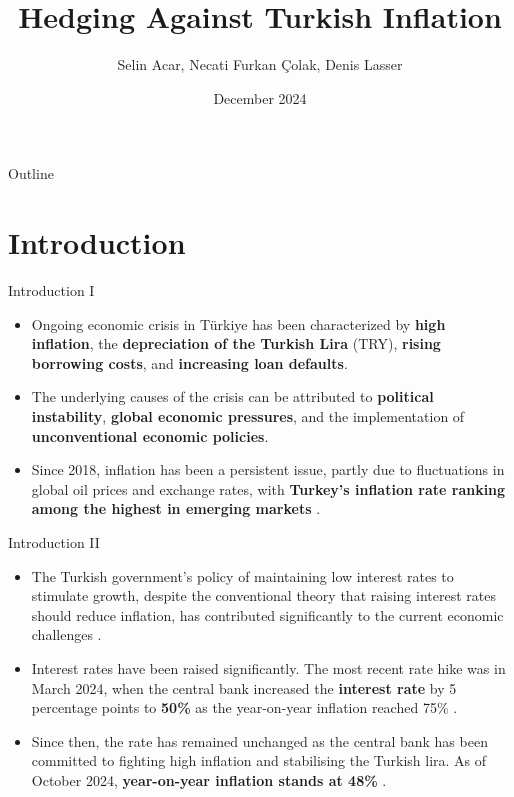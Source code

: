 \documentclass{beamer}
\title{Hedging Against Turkish Inflation}
\author{Selin Acar, Necati Furkan Çolak, Denis Lasser}
\date{December 2024}
\begin{document}
\frame{\titlepage}

\begin{frame}{Outline}
\tableofcontents
\end{frame}

\section{Introduction}
\begin{frame}{Introduction I}
\begin{itemize}
\tightlist
\item Ongoing economic crisis in Türkiye has been characterized by
\textbf{high inflation}, the \textbf{depreciation of the Turkish Lira}
(TRY), \textbf{rising borrowing costs}, and \textbf{increasing loan
defaults}.
\item The underlying causes of the crisis can be attributed to
\textbf{political instability}, \textbf{global economic pressures},
and the implementation of \textbf{unconventional economic policies}.
\item Since 2018, inflation has been a persistent issue, partly due to
fluctuations in global oil prices and exchange rates, with
\textbf{Turkey's inflation rate ranking among the highest in emerging
markets} \citep{yilmazkuday_2022}.
\end{itemize}
\end{frame}

\begin{frame}{Introduction II}
\begin{itemize}
\tightlist
\item The Turkish government's policy of maintaining low interest rates to
stimulate growth, despite the conventional theory that raising
interest rates should reduce inflation, has contributed significantly
to the current economic challenges \citep{kantur_ozcan_2021}.
\item Interest rates have been raised significantly. The most recent rate
hike was in March 2024, when the central bank increased the
\textbf{interest rate} by 5 percentage points to \textbf{50\%} as the
year-on-year inflation reached 75\% \citep{bloomberg_2024}.
\item Since then, the rate has remained unchanged as the central bank has
been committed to fighting high inflation and stabilising the Turkish
lira. As of October 2024, \textbf{year-on-year inflation stands at
48\%} \citep{bloomberg_2024}.
\end{itemize}
\end{frame}
\end{document}
